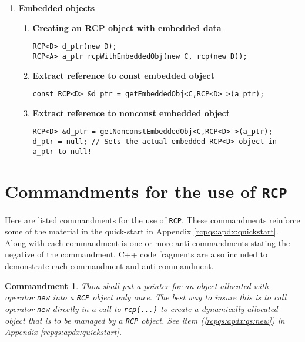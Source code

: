 \documentclass[pdf,ps2pdf,11pt]{SANDreport}
\newtheorem{commandment}{Commandment}
\begin{document}
\begin{enumerate}
\item {\bf Embedded objects}
\label{rcpqs:apdx:qs:embedded-objects}

%
\begin{enumerate}
%
\item {\bf Creating an RCP object with embedded data}
%
{\small\begin{verbatim}
RCP<D> d_ptr(new D);
RCP<A> a_ptr rcpWithEmbeddedObj(new C, rcp(new D));
\end{verbatim}}
%
\item {\bf Extract reference to const embedded object}
%
{\small\begin{verbatim}
const RCP<D> &d_ptr = getEmbeddedObj<C,RCP<D> >(a_ptr);
\end{verbatim}}
%
\item {\bf Extract reference to nonconst embedded object}
%
{\small\begin{verbatim}
RCP<D> &d_ptr = getNonconstEmbeddedObj<C,RCP<D> >(a_ptr);
d_ptr = null; // Sets the actual embedded RCP<D> object in a_ptr to null!
\end{verbatim}}
%
\end{enumerate}


\end{enumerate}

%
\section{Commandments for the use of {}\texttt{RCP}}
\label{rcpqs:apdx:commandments}
%

Here are listed commandments for the use of {}\texttt{RCP}.  These
commandments reinforce some of the material in the quick-start in Appendix
{}\ref{rcpqs:apdx:quickstart}.  Along with each commandment is one or more
anti-commandments stating the negative of the commandment.  C++ code fragments
are also included to demonstrate each commandment and anti-commandment.

\begin{commandment}\label{rcp:cmd:rcp-new}
Thou shall put a pointer for an object allocated with operator
{}\texttt{new} into a {}\texttt{RCP} object only once.
The best way to insure this is to call operator {}\texttt{new}
directly in a call to {}\texttt{rcp(...)} to create a dynamically
allocated object that is to be managed by a
{}\texttt{RCP} object.  See item
({}\ref{rcpqs:apdx:qs:new}) in Appendix
{}\ref{rcpqs:apdx:quickstart}.
\end{commandment}
\end{document}
